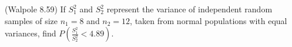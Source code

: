 \documentclass[14pt]{exam}
\begin{document}
\begin{questions}
		
		\question
		(Walpole 8.59)
		If $S_1^2$ and $S_2^2$ represent the variance of independent random samples of size $n_1 = 8$ and $n_2 = 12$, taken from normal populations with equal variances, find $P(\frac{S_1^2}{S_2^2} < 4.89)$.
	\end{questions}
\end{document}
